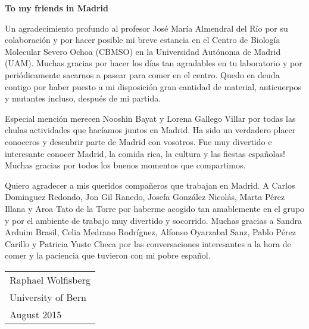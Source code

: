 \begin{addmargin}{0.025\textwidth}
\newpage
 
\Large\textbf{To my friends in Madrid}

\normalsize
\par\bigskip
\noindent 
Un agradecimiento profundo al profesor José María Almendral del Río por su colaboración y por hacer posible mi breve estancia en el Centro de Biología Molecular Severo Ochoa (CBMSO) en la Universidad Autónoma de Madrid (UAM). Muchas gracias por hacer los días tan agradables en tu laboratorio y por periódicamente sacarnos a pasear para comer en el centro. Quedo en deuda contigo por haber puesto a mi disposición gran cantidad de material, anticuerpos y mutantes incluso, después de mi partida.

\par\medskip 
\noindent
Especial mención merecen Nooshin Bayat y Lorena Gallego Villar por todas las chulas actividades que hacíamos juntos en Madrid. Ha sido un verdadero placer conoceros y descubrir parte de Madrid con vosotros. Fue muy divertido e interesante conocer Madrid, la comida rica, la cultura y las fiestas españolas! Muchas gracias por todos los buenos momentos que compartimos.
   
\par\medskip 
\noindent   
Quiero agradecer a mis queridos compañeros que trabajan en Madrid. A Carlos Dominguez Redondo, Jon Gil Ranedo, Josefa González Nicolás, Marta Pérez Illana y Aroa Tato de la Torre por haberme acogido tan amablemente en el grupo y por el ambiente de trabajo muy divertido y socorrido. Muchas gracias a Sandra Arduim Brasil, Celia Medrano Rodríguez, Alfonso Oyarzabal Sanz, Pablo Pérez Carillo y Patricia Yuste Checa por las conversaciones interesantes a la hora de comer y la paciencia que tuvieron con mi pobre español.      
\end{addmargin}

 
\par\bigskip
\par\bigskip
\par\bigskip
\par\bigskip
\noindent \hfill\begin{tabular}{l}
Raphael Wolfisberg\\
University of Bern\\
August 2015\\
\end{tabular}

